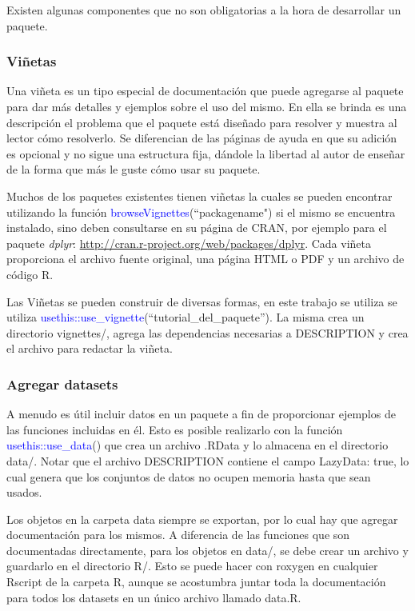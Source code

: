 Existen algunas componentes que no son obligatorias a la hora de desarrollar un paquete. 

\subsubsection{Viñetas}

Una viñeta es un tipo especial de documentación que puede agregarse al paquete para dar más detalles y ejemplos sobre el uso del mismo. En ella se brinda es una descripción el problema que el paquete está diseñado para resolver y muestra al lector cómo resolverlo. Se diferencian de las páginas de ayuda en que su adición es opcional y no sigue una estructura fija, dándole la libertad al autor de enseñar de la forma que más le guste cómo usar su paquete.

Muchos de los paquetes existentes tienen viñetas la cuales se pueden encontrar utilizando la función \textcolor{blue}{browseVignettes}(``packagename") si el mismo se encuentra instalado, sino deben consultarse en su página de CRAN, por ejemplo para el paquete \emph{dplyr}: \url{http://cran.r-project.org/web/packages/dplyr}. Cada viñeta proporciona el archivo fuente original, una página HTML o PDF y un archivo de código R. 

Las Viñetas se pueden construir de diversas formas, en este trabajo se utiliza se utiliza \textcolor{blue}{usethis::use\_vignette}(``tutorial\_del\_paquete''). La misma crea un directorio vignettes/, agrega las dependencias necesarias a DESCRIPTION y crea el archivo para redactar la viñeta. 


\subsubsection{Agregar datasets}

A menudo es útil incluir datos en un paquete a fin de proporcionar ejemplos de las funciones incluidas en él. Esto es posible realizarlo con la función \textcolor{blue}{usethis::use\_data}() que crea un archivo .RData y lo almacena en el directorio data/.  Notar que el archivo DESCRIPTION contiene el campo LazyData: true, lo cual genera que los conjuntos de datos no ocupen memoria hasta que sean usados.

Los objetos en la carpeta data siempre se exportan, por lo cual hay que agregar documentación para los mismos. A diferencia de las funciones que son documentadas directamente, para los objetos en data/, se debe crear un archivo y guardarlo en el directorio R/. Esto se puede hacer con roxygen en cualquier Rscript de la carpeta R, aunque se acostumbra juntar toda la documentación para todos los datasets en un único archivo llamado data.R.\\

